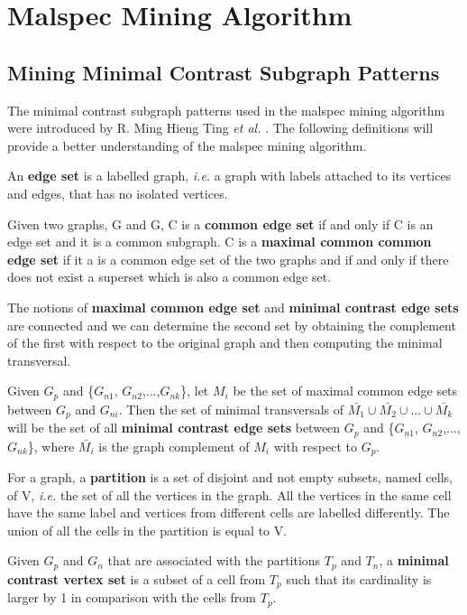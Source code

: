 \chapter{Malspec Mining Algorithm}
\label{chapter:third}

\section{Mining Minimal Contrast Subgraph Patterns}
\label{third:graph-defs}

The minimal contrast subgraph patterns used in the malspec mining algorithm were introduced by R. Ming Hieng Ting \textit{et al.} \cite{minimal-contrast-subgraph}. The following definitions will provide a better understanding of the malspec mining algorithm.

An \textbf{edge set} is a labelled graph, \textit{i.e.} a graph with labels attached to its vertices and edges, that has no isolated vertices.

Given two graphs, G and G, C is a \textbf{common edge set} if and only if C is an edge set and it is a common subgraph. C is a \textbf{maximal common common edge set} if it a is a common edge set of the two graphs and if and only if there does not exist a superset which is also a common edge set.

The notions of \textbf{maximal common edge set} and \textbf{minimal contrast edge sets} are connected and we can determine the second set by obtaining the complement of the first with respect to the original graph and then computing the minimal transversal.

Given $G_{p}$ and \{$G_{n1}$, $G_{n2}$,...,$G_{nk}$\}, let $M_{i}$ be the set of maximal common edge sets between $G_{p}$ and $G_{ni}$. Then the set of minimal transversals of $\bar{M_{1}} \cup \bar{M_{2}} \cup ... \cup \bar{M_{k}}$ will be the set of all \textbf{minimal contrast edge sets} between $G_{p}$ and \{$G_{n1}$, $G_{n2}$,...,$G_{nk}$\}, where $\bar{M_{i}}$ is the graph complement of $M_{i}$ with respect to $G_{p}$.

For a graph, a \textbf{partition} is a set of disjoint and not empty subsets, named cells, of V, \textit{i.e.} the set of all the vertices in the graph. All the vertices in the same cell have the same label and vertices from different cells are labelled differently. The union of all the cells in the partition is equal to V.

Given $G_{p}$ and $G_{n}$ that are associated with the partitions $T_{p}$ and $T_{n}$, a \textbf{minimal contrast vertex set} is a subset of a cell from $T_{p}$ such that its cardinality is larger by 1 in comparison with the cells from $T_{p}$.

